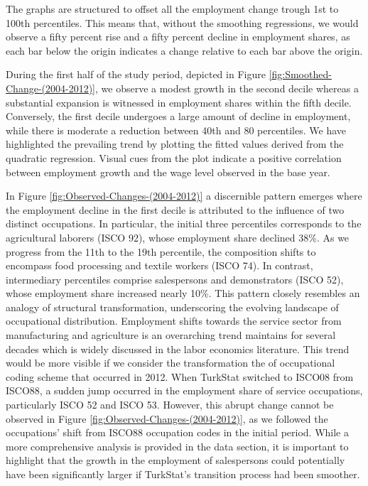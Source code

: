 \begin{onehalfspace}
The graphs are structured to offset all the employment change trough
1st to 100th percentiles. This means that, without the smoothing regressions,
we would observe a fifty percent rise and a fifty percent decline
in employment shares, as each bar below the origin indicates a change
relative to each bar above the origin.

During the first half of the study period, depicted in Figure \ref{fig:Smoothed-Change-(2004-2012)},
we observe a modest growth in the second decile whereas a substantial
expansion is witnessed in employment shares within the fifth decile.
Conversely, the first decile undergoes a large amount of decline in
employment, while there is moderate a reduction between 40th and 80
percentiles. We have highlighted the prevailing trend by plotting
the fitted values derived from the quadratic regression. Visual cues
from the plot indicate a positive correlation between employment growth
and the wage level observed in the base year.

In Figure \ref{fig:Observed-Changes-(2004-2012)} a discernible pattern
emerges where the employment decline in the first decile is attributed
to the influence of two distinct occupations. In particular, the initial
three percentiles corresponds to the agricultural laborers (ISCO 92),
whose employment share declined 38\%. As we progress from the 11th
to the 19th percentile, the composition shifts to encompass food processing
and textile workers (ISCO 74). In contrast, intermediary percentiles
comprise salespersons and demonstrators (ISCO 52), whose employment
share increased nearly 10\%. This pattern closely resembles an analogy
of structural transformation, underscoring the evolving landscape
of occupational distribution. Employment shifts towards the service
sector from manufacturing and agriculture is an overarching trend
maintains for several decades which is widely discussed in the labor
economics literature. This trend would be more visible if we consider
the transformation the of occupational coding scheme that occurred
in 2012. When TurkStat switched to ISCO08 from ISCO88, a sudden jump
occurred in the employment share of service occupations, particularly
ISCO 52 and ISCO 53. However, this abrupt change cannot be observed
in Figure \ref{fig:Observed-Changes-(2004-2012)}, as we followed
the occupations' shift from ISCO88 occupation codes in the initial
period. While a more comprehensive analysis is provided in the data
section, it is important to highlight that the growth in the employment
of salespersons could potentially have been significantly larger if
TurkStat's transition process had been smoother.


\end{onehalfspace}
